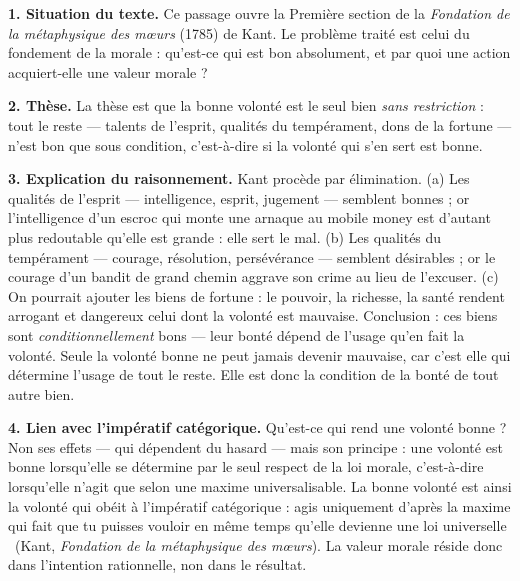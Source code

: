 \documentclass[11pt]{article}
\newcommand{\cle}[1]{{\popxbold\color{popdark}#1}}
\begin{document}
\begin{corrige}

\textbf{1. Situation du texte.} Ce passage ouvre la Première section de la \emph{Fondation de la métaphysique des mœurs} (1785) de Kant. Le problème traité est celui du fondement de la morale : qu'est-ce qui est bon absolument, et par quoi une action acquiert-elle une valeur morale ?

\textbf{2. Thèse.} La thèse est que la \cle{bonne volonté} est le seul bien \emph{sans restriction} : tout le reste — talents de l'esprit, qualités du tempérament, dons de la fortune — n'est bon que sous condition, c'est-à-dire si la volonté qui s'en sert est bonne.

\textbf{3. Explication du raisonnement.} Kant procède par élimination. (a) Les qualités de l'esprit — intelligence, esprit, jugement — semblent bonnes ; or l'intelligence d'un escroc qui monte une arnaque au mobile money est d'autant plus redoutable qu'elle est grande : elle sert le mal. (b) Les qualités du tempérament — courage, résolution, persévérance — semblent désirables ; or le courage d'un bandit de grand chemin aggrave son crime au lieu de l'excuser. (c) On pourrait ajouter les biens de fortune : le pouvoir, la richesse, la santé rendent arrogant et dangereux celui dont la volonté est mauvaise. Conclusion : ces biens sont \emph{conditionnellement} bons — leur bonté dépend de l'usage qu'en fait la volonté. Seule la volonté bonne ne peut jamais devenir mauvaise, car c'est elle qui détermine l'usage de tout le reste. Elle est donc la condition de la bonté de tout autre bien.

\textbf{4. Lien avec l'impératif catégorique.} Qu'est-ce qui rend une volonté bonne ? Non ses effets — qui dépendent du hasard — mais son principe : une volonté est bonne lorsqu'elle se détermine par le seul respect de la loi morale, c'est-à-dire lorsqu'elle n'agit que selon une maxime universalisable. La bonne volonté est ainsi la volonté qui obéit à l'\cle{impératif catégorique} : \guillemotleft agis uniquement d'après la maxime qui fait que tu puisses vouloir en même temps qu'elle devienne une loi universelle \guillemotright\ (Kant, \emph{Fondation de la métaphysique des mœurs}). La valeur morale réside donc dans l'intention rationnelle, non dans le résultat.


\end{corrige}
\end{document}

